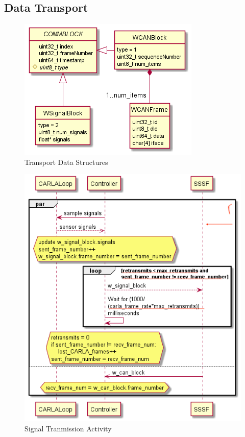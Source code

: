 \documentclass[letterpaper,twocolumn,12pt]{article}
\begin{document}
\subsection{Data Transport}
\begin{figure}[]
    \centering
    \includegraphics[width=\linewidth]{out/images/data_structures/data_structures.png}
    \caption{Transport Data Structures}
    \label{fig:ds}
\end{figure}
\begin{figure}[]
    \centering
    \includegraphics[width=\linewidth]{out/images/signal_control/signal_control.png}
    \caption{Signal Tranmission Activity}
    \label{fig:sig_x}
\end{figure}
\end{document}
